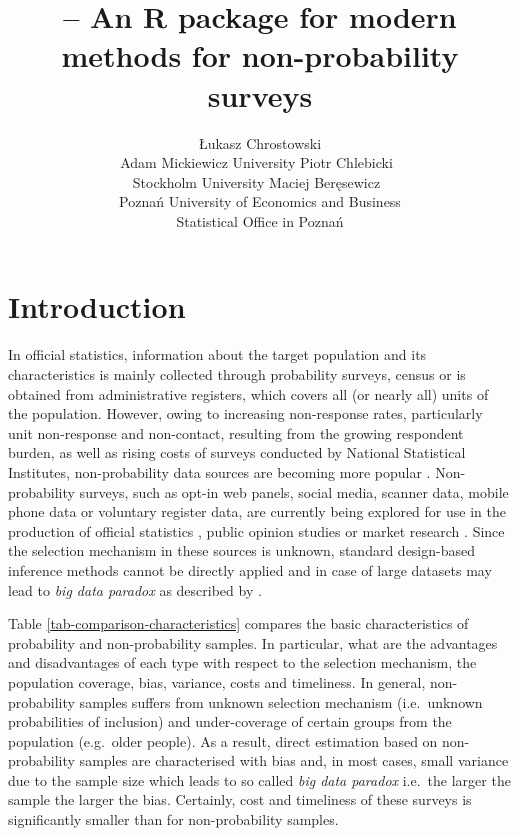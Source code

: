 \documentclass[
]{jss}
\author{
Łukasz Chrostowski\\Adam Mickiewicz University \And Piotr
Chlebicki~\orcidlink{0009-0006-4867-7434}\\Stockholm University
\AND Maciej Beręsewicz~\orcidlink{0000-0002-8281-4301}\\Poznań
University of Economics and Business\\
Statistical Office in Poznań
}
\title{\pkg{nonprobsvy} -- An R package for modern methods for
non-probability surveys}
\begin{document}
\section{Introduction}\label{sec-introduction}

In official statistics, information about the target population and its
characteristics is mainly collected through probability surveys, census
or is obtained from administrative registers, which covers all (or
nearly all) units of the population. However, owing to increasing
non-response rates, particularly unit non-response and non-contact,
resulting from the growing respondent burden, as well as rising costs of
surveys conducted by National Statistical Institutes, non-probability
data sources are becoming more popular
\citep{berkesewicz2017two, beaumont2020probability, biffignandi2021handbook}.
Non-probability surveys, such as opt-in web panels, social media,
scanner data, mobile phone data or voluntary register data, are
currently being explored for use in the production of official
statistics \citep{citro2014multiple, daas2015big}, public opinion
studies \citep{Schonlau2017} or market research \citep[cf.][]{Grow2022}.
Since the selection mechanism in these sources is unknown, standard
design-based inference methods cannot be directly applied and in case of
large datasets may lead to \textit{big data paradox} as described by
\citet{meng2018statistical}.

Table \ref{tab-comparison-characteristics} compares the basic
characteristics of probability and non-probability samples. In
particular, what are the advantages and disadvantages of each type with
respect to the selection mechanism, the population coverage, bias,
variance, costs and timeliness. In general, non-probability samples
suffers from unknown selection mechanism (i.e.~unknown probabilities of
inclusion) and under-coverage of certain groups from the population
(e.g.~older people). As a result, direct estimation based on
non-probability samples are characterised with bias and, in most cases,
small variance due to the sample size which leads to so called
\textit{big data paradox} i.e.~the larger the sample the larger the
bias. Certainly, cost and timeliness of these surveys is significantly
smaller than for non-probability samples.
\end{document}
